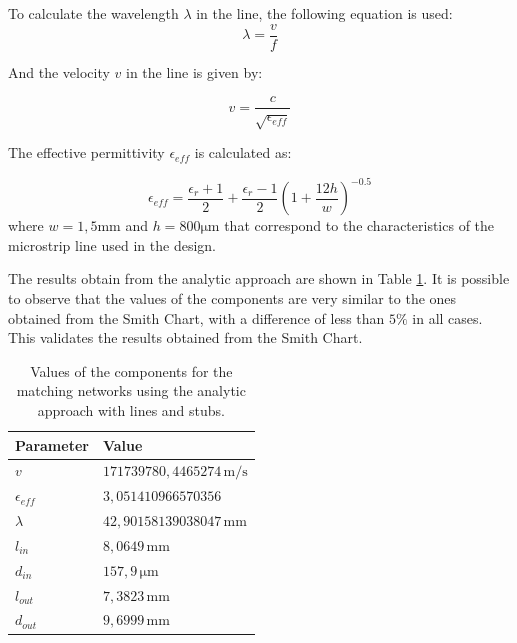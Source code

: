 To calculate the wavelength $\lambda$ in the line, the following equation is used:
\begin{equation}
    \lambda = \frac{v}{f}
\end{equation}

And the velocity $v$ in the line is given by:

\begin{equation}
    v = \frac{c}{\sqrt{\epsilon_{eff}}}
\end{equation}

The effective permittivity $\epsilon_{eff}$ is calculated as:

\begin{equation}
    \epsilon_{eff} = \frac{\epsilon_r + 1}{2} + \frac{\epsilon_r - 1}{2}\left(1+\frac{12h}{w}\right)^{-0.5}
\end{equation}
where $w = 1,5 \si{\milli \meter}$ and $h = 800 \si{\micro \meter}$ that correspond to the characteristics of the microstrip line used in the design.


The results obtain from the analytic approach are shown in Table \ref{tab:MatchingValuesLines}. It is possible to observe that the values of the components are very similar to the ones obtained from the Smith Chart, with a difference of less than $5\%$ in all cases. This validates the results obtained from the Smith Chart.

\begin{table}[H]
    \centering
    \caption{Values of the components for the matching networks using the analytic approach with lines and stubs.}
    \begin{tabularx}{\textwidth}{>{\centering\arraybackslash}X >{\centering\arraybackslash}X}
        \toprule
        \textbf{Parameter} & \textbf{Value} \\
        \midrule
        $v$     & $171739780,4465274\,\si{\meter \per \second}$ \\
        \midrule
        $\epsilon_{eff}$     & $3,051410966570356$ \\
        \midrule
        $\lambda$     & $42,90158139038047\,\si{\milli\meter}$ \\
        \midrule
        $l_{in}$     & $8,0649\,\si{\milli\meter}$ \\
        \midrule
        $d_{in}$   & $157,9\,\si{\micro\meter}$ \\
        \midrule
        $l_{out}$     & $7,3823\,\si{\milli\meter}$\\
        \midrule
        $d_{out}$   & $9,6999\,\si{\milli\meter}$\\
        \bottomrule
    \end{tabularx}
    \label{tab:MatchingValuesLines}
\end{table}

